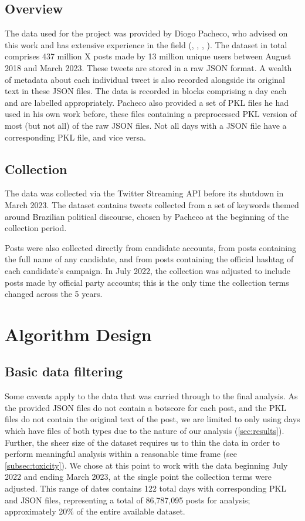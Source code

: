 \documentclass[a4paper,11pt]{article}  %
\begin{document}
	\subsection{Overview}
	\label{subsec:overview}
	The data used for the project was provided by Diogo Pacheco, who advised on this work and has extensive experience in the field (\textcite{pachecoBotsElectionsControversies2023}, \textcite{pachecoUncoveringCoordinatedNetworks2021}, \textcite{chenNeutralBotsProbe2021},
	\textcite{pachecoUnveilingCoordinatedGroups2020}). The dataset in total comprises 437 million X posts made by 13 million unique users between August 2018 and March 2023. These tweets are stored in a raw JSON format. A wealth of metadata about each individual tweet is also recorded alongside its original text in these JSON files. The data is recorded in blocks comprising a day each and are labelled appropriately. 
	Pacheco also provided a set of PKL files he had used in his own work before, these files containing a preprocessed PKL version of most (but not all) of the raw JSON files. Not all days with a JSON file have a corresponding PKL file, and vice versa.
	\subsection{Collection}
	\label{subsec:terms}
	The data was collected via the Twitter Streaming API before its shutdown in March 2023. The dataset contains tweets collected from a set of keywords themed around Brazilian political discourse, chosen by Pacheco at the beginning of the collection period.
	
	Posts were also collected directly from candidate accounts, from posts containing the full name of any candidate, and from posts containing the official hashtag of each candidate's campaign. In July 2022, the collection was adjusted to include posts made by official party accounts; this is the only time the collection terms changed across the 5 years.
	
	\section{Algorithm Design}
	\label{sec:design}
	\subsection{Basic data filtering}
	\label{subsec:filters}
	Some caveats apply to the data that was carried through to the final analysis. As the provided JSON files do not contain a botscore for each post, and the PKL files do not contain the original text of the post, we are limited to only using days which have files of both types due to the nature of our analysis (\autoref{sec:results}). Further, the sheer size of the dataset requires us to thin the data in order to perform meaningful analysis within a reasonable time frame (see \autoref{subsec:toxicity}). We chose at this point to work with the data beginning July 2022 and ending March 2023, at the single point the collection terms were adjusted. This range of dates contains 122 total days with corresponding PKL and JSON files, representing a total of 86,787,095 posts for analysis; approximately 20\% of the entire available dataset. 
	
\end{document}
